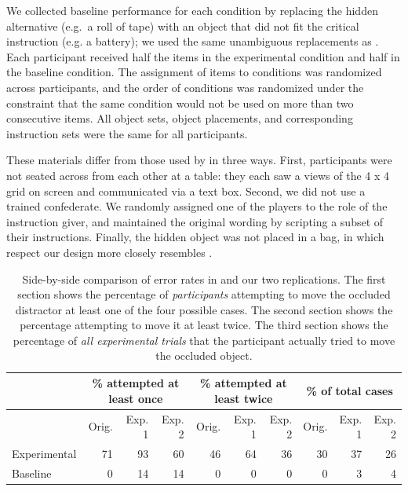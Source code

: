 \documentclass[10pt,letterpaper]{article}
\begin{document}
We collected baseline performance for each condition by replacing the hidden alternative (e.g.~a roll of tape) with an object that did not fit the critical instruction (e.g. a battery); we used the same unambiguous replacements as . Each participant received half the items in the experimental condition and half in the baseline condition. The assignment of items to conditions was randomized across participants, and the order of conditions was randomized under the constraint that the same condition would not be used on more than two consecutive items. All object sets, object placements, and corresponding instruction sets were the same for all participants.

These materials differ from those used by  in three ways. First, participants were not seated across from each other at a table: they each saw a views of the 4 x 4 grid on screen and communicated via a text box. Second, we did not use a trained confederate. We randomly assigned one of the players to the role of the instruction giver, and maintained the original wording by scripting a subset of their instructions. Finally, the hidden object was not placed in a bag, in which respect our design more closely resembles .

\begin{table}
\begin{center}
\begin{tabular}{ p{2cm} | r | r |  r || r | r | r || r | r | r}
& \multicolumn{3}{c||}{\% attempted at least once} & \multicolumn{3}{c||}{\% attempted at least twice} & \multicolumn{3}{c}{\% of total cases}\\
\hline
& Orig. & Exp. 1 & Exp. 2 & Orig. & Exp. 1 & Exp. 2 & Orig. & Exp. 1 & Exp. 2  \\
Experimental & 71 & 93 & 60 & 46 & 64 & 36 & 30 & 37 & 26\\
Baseline & 0 & 14 & 14 & 0 & 0 & 0 & 0 & 3 & 4\\
\end{tabular}
\caption{Side-by-side comparison of error rates in  and our two replications. The first section shows the percentage of \emph{participants} attempting to move the occluded distractor at least one of the four possible cases. The second section shows the percentage attempting to move it at least twice. The third section shows the percentage of \emph{all experimental trials} that the participant actually tried to move the occluded object. }
\label{table:mainResults}
\end{center}
\end{table}
\end{document}
